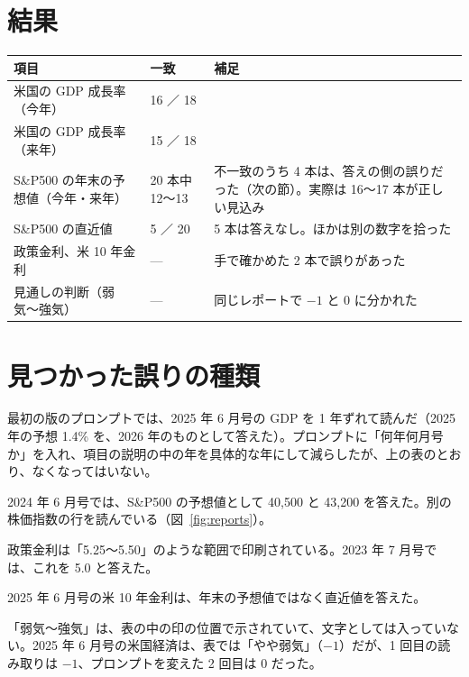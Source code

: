\documentclass[xelatex,ja=standard,jafont=hiragino-pron,a4paper,10pt]{bxjsreport}
\newcommand{\SP}{S\&P500}
\newcommand{\figref}[1]{図~\ref{#1}}
\begin{document}
\section{結果}

\begin{longtable}{p{5.40cm}p{2.20cm}p{6.80cm}}
\toprule
\textbf{項目} & \textbf{一致} & \textbf{補足} \\
\midrule
\endfirsthead
\bottomrule
\endfoot
米国の GDP 成長率（今年） & 16 ／ 18 & \\
米国の GDP 成長率（来年） & 15 ／ 18 & \\
\SP{} の年末の予想値（今年・来年） & 20 本中 12〜13 & 不一致のうち 4 本は、答えの側の誤りだった（次の節）。実際は 16〜17 本が正しい見込み \\
\SP{} の直近値 & 5 ／ 20 & 5 本は答えなし。ほかは別の数字を拾った \\
政策金利、米 10 年金利 & --- & 手で確かめた 2 本で誤りがあった \\
見通しの判断（弱気〜強気） & --- & 同じレポートで $-1$ と 0 に分かれた \\
\end{longtable}

\section{見つかった誤りの種類}

\begin{description}[leftmargin=2em,style=nextline,itemsep=0.4em]
\item[年の列の取り違え] 最初の版のプロンプトでは、2025 年 6 月号の GDP を 1 年ずれて読んだ（2025 年の予想 1.4\% を、2026 年のものとして答えた）。プロンプトに「何年何月号か」を入れ、項目の説明の中の年を具体的な年にして減らしたが、上の表のとおり、なくなってはいない。
\item[別の行を読む] 2024 年 6 月号では、\SP{} の予想値として 40,500 と 43,200 を答えた。別の株価指数の行を読んでいる（\figref{fig:reports}）。
\item[範囲の読み方] 政策金利は「5.25〜5.50」のような範囲で印刷されている。2023 年 7 月号では、これを 5.0 と答えた。
\item[予想値と直近値の取り違え] 2025 年 6 月号の米 10 年金利は、年末の予想値ではなく直近値を答えた。
\item[図で示された判断] 「弱気〜強気」は、表の中の印の位置で示されていて、文字としては入っていない。2025 年 6 月号の米国経済は、表では「やや弱気」（$-1$）だが、1 回目の読み取りは $-1$、プロンプトを変えた 2 回目は 0 だった。
\end{description}
\end{document}
